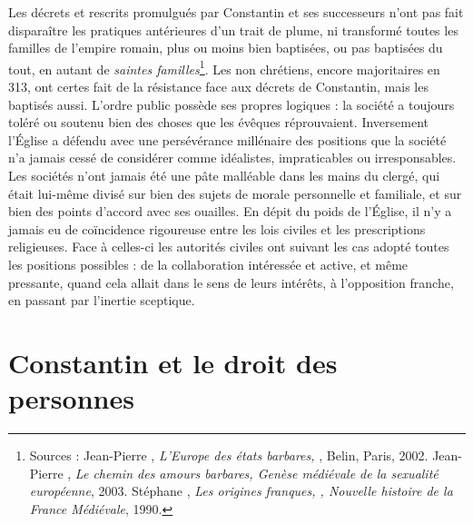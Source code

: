  Les décrets et rescrits promulgués par Constantin et ses successeurs n'ont pas fait disparaître les pratiques antérieures d'un trait de plume, ni transformé toutes les familles de l'empire romain, plus ou moins bien baptisées, ou pas baptisées du tout, en autant de \emph{saintes familles}\footnote{Sources : Jean-Pierre , \emph{L'Europe des états barbares, }, Belin, Paris, 2002. Jean-Pierre , \emph{Le chemin des amours barbares, Genèse médiévale de la sexualité européenne}, 2003. Stéphane , \emph{Les origines franques, , Nouvelle histoire de la France Médiévale}, 1990.}. Les non chrétiens, encore majoritaires en 313, ont certes fait de la résistance face aux décrets de Constantin, mais les baptisés aussi. L'ordre public possède ses propres logiques : la société a toujours toléré ou soutenu bien des choses que les évêques réprouvaient. Inversement l'Église a défendu avec une persévérance millénaire des positions que la société n'a jamais cessé de considérer comme idéalistes, impraticables ou irresponsables. Les sociétés n'ont jamais été une pâte malléable dans les mains du clergé, qui était lui-même divisé sur bien des sujets de morale personnelle et familiale, et sur bien des points d'accord avec ses ouailles. En dépit du poids de l'Église, il n'y a jamais eu de coïncidence rigoureuse entre les lois civiles et les prescriptions religieuses. Face à celles-ci les autorités civiles ont suivant les cas adopté toutes les positions possibles : de la collaboration intéressée et active, et même pressante, quand cela allait dans le sens de leurs intérêts, à l'opposition franche, en passant par l'inertie sceptique.


\section{Constantin et le droit des personnes}


